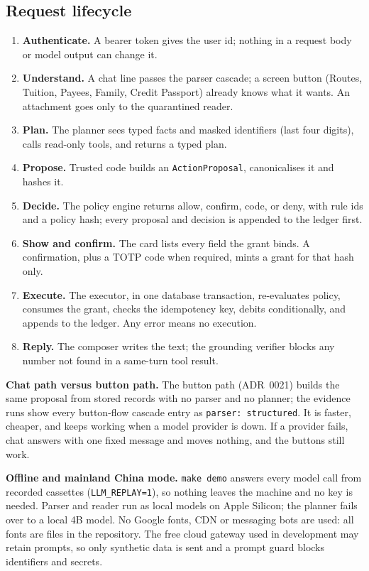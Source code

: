 \documentclass[11pt,a4paper]{article}
\newcommand{\code}[1]{\texttt{\small #1}}
\begin{document}
\subsection{Request lifecycle}
\begin{samepage}
\begin{enumerate}[leftmargin=1.6em]
\item \textbf{Authenticate.} A bearer token gives the user id; nothing in a request body or model output can change it.
\item \textbf{Understand.} A chat line passes the parser cascade; a screen button (Routes, Tuition, Payees, Family, Credit Passport) already knows what it wants. An attachment goes only to the quarantined reader.
\item \textbf{Plan.} The planner sees typed facts and masked identifiers (last four digits), calls read-only tools, and returns a typed plan.
\item \textbf{Propose.} Trusted code builds an \code{ActionProposal}, canonicalises it and hashes it.
\item \textbf{Decide.} The policy engine returns allow, confirm, code, or deny, with rule ids and a policy hash; every proposal and decision is appended to the ledger first.
\item \textbf{Show and confirm.} The card lists every field the grant binds. A confirmation, plus a TOTP code when required, mints a grant for that hash only.
\item \textbf{Execute.} The executor, in one database transaction, re-evaluates policy, consumes the grant, checks the idempotency key, debits conditionally, and appends to the ledger. Any error means no execution.
\item \textbf{Reply.} The composer writes the text; the grounding verifier blocks any number not found in a same-turn tool result.
\end{enumerate}
\end{samepage}

\textbf{Chat path versus button path.} The button path (ADR~0021) builds the same proposal from stored records with no parser and no planner; the evidence runs show every button-flow cascade entry as \code{parser: structured}. It is faster, cheaper, and keeps working when a model provider is down. If a provider fails, chat answers with one fixed message and moves nothing, and the buttons still work.

\textbf{Offline and mainland China mode.} \code{make demo} answers every model call from recorded cassettes (\code{LLM\_REPLAY=1}), so nothing leaves the machine and no key is needed. Parser and reader run as local models on Apple Silicon; the planner fails over to a local 4B model. No Google fonts, CDN or messaging bots are used: all fonts are files in the repository. The free cloud gateway used in development may retain prompts, so only synthetic data is sent and a prompt guard blocks identifiers and secrets.
\end{document}
